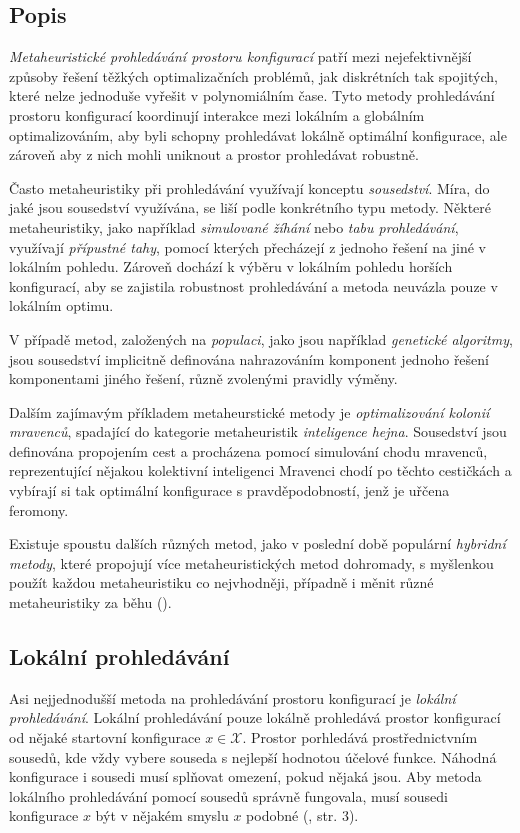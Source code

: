 \subsection{Popis}

\textit{Metaheuristické prohledávání prostoru konfigurací} patří mezi nejefektivnější způsoby řešení těžkých optimalizačních problémů,
jak diskrétních tak spojitých,
které nelze jednoduše vyřešit v polynomiálním čase.
Tyto metody prohledávání prostoru konfigurací koordinují interakce mezi lokálním a globálním optimalizováním,
aby byli schopny prohledávat lokálně optimální konfigurace, ale zároveň aby z nich mohli uniknout a prostor prohledávat robustně.

Často metaheuristiky při prohledávání využívají konceptu \textit{sousedství}.
Míra, do jaké jsou sousedství využívána, se liší podle konkrétního typu metody.
Některé metaheuristiky, jako například \textit{simulované žíhání} nebo \textit{tabu prohledávání}, využívají \textit{přípustné tahy},
pomocí kterých přecházejí z jednoho řešení na jiné v lokálním pohledu.
Zároveň dochází k výběru v lokálním pohledu horších konfigurací, aby se zajistila robustnost prohledávání
a metoda neuvázla pouze v lokálním optimu.

V případě metod, založených na \textit{populaci}, jako jsou například \textit{genetické algoritmy}, jsou sousedství implicitně definována
nahrazováním komponent jednoho řešení komponentami jiného řešení, různě zvolenými pravidly výměny.

Dalším zajímavým příkladem metaheurstické metody je \textit{optimalizování kolonií mravenců}, spadající do kategorie metaheuristik \textit{inteligence hejna}.
Sousedství jsou definována propojením cest a procházena pomocí simulování chodu mravenců, reprezentující nějakou kolektivní inteligenci
Mravenci chodí po těchto cestičkách a vybírají si tak optimální konfigurace s pravděpodobností, jenž je uřčena feromony.

Existuje spoustu dalších různých metod, jako v poslední době populární \textit{hybridní metody},
které propojují více metaheuristických metod dohromady, s myšlenkou použít každou metaheuristiku co nejvhodněji,
případně i měnit různé metaheuristiky za běhu (\citet{GlovKoch03}).

\subsection{Lokální prohledávání}

Asi nejjednodušší metoda na prohledávání prostoru konfigurací je \textit{lokální prohledávání}.
Lokální prohledávání pouze lokálně prohledává prostor konfigurací od nějaké startovní konfigurace $x \in \mathcal{X}$. 
Prostor porhledává prostřednictvním sousedů, kde vždy vybere souseda s nejlepší hodnotou účelové funkce.
Náhodná konfigurace i sousedi musí splňovat omezení, pokud nějaká jsou.
Aby metoda lokálního prohledávání pomocí sousedů správně fungovala, musí sousedi konfigurace $x$ být v nějakém smyslu $x$ podobné (\citet{HybridMeta}, str. 3).

